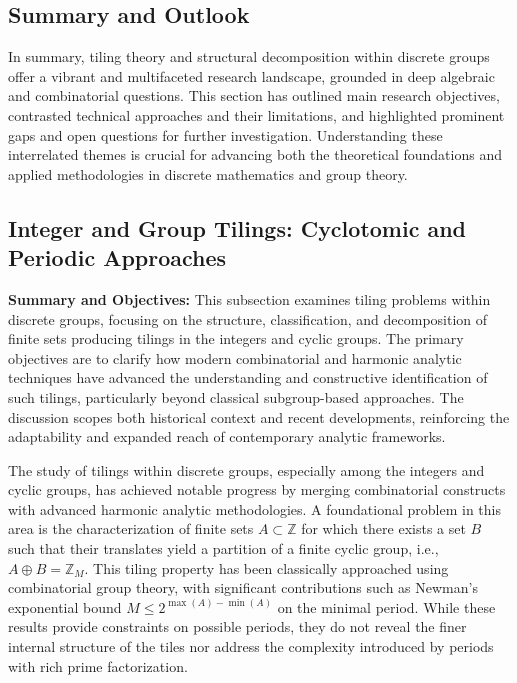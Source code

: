 \documentclass[sigconf]{acmart}
\begin{document}
\subsection*{Summary and Outlook}

In summary, tiling theory and structural decomposition within discrete groups offer a vibrant and multifaceted research landscape, grounded in deep algebraic and combinatorial questions. This section has outlined main research objectives, contrasted technical approaches and their limitations, and highlighted prominent gaps and open questions for further investigation. Understanding these interrelated themes is crucial for advancing both the theoretical foundations and applied methodologies in discrete mathematics and group theory.

\subsection{Integer and Group Tilings: Cyclotomic and Periodic Approaches}

\textbf{Summary and Objectives:} 
This subsection examines tiling problems within discrete groups, focusing on the structure, classification, and decomposition of finite sets producing tilings in the integers and cyclic groups. The primary objectives are to clarify how modern combinatorial and harmonic analytic techniques have advanced the understanding and constructive identification of such tilings, particularly beyond classical subgroup-based approaches. The discussion scopes both historical context and recent developments, reinforcing the adaptability and expanded reach of contemporary analytic frameworks.

The study of tilings within discrete groups, especially among the integers and cyclic groups, has achieved notable progress by merging combinatorial constructs with advanced harmonic analytic methodologies. A foundational problem in this area is the characterization of finite sets \( A \subset \mathbb{Z} \) for which there exists a set \( B \) such that their translates yield a partition of a finite cyclic group, i.e., \( A \oplus B = \mathbb{Z}_M \). This tiling property has been classically approached using combinatorial group theory, with significant contributions such as Newman's exponential bound \( M \leq 2^{\max(A)-\min(A)} \) on the minimal period. While these results provide constraints on possible periods, they do not reveal the finer internal structure of the tiles nor address the complexity introduced by periods with rich prime factorization.
\end{document}
